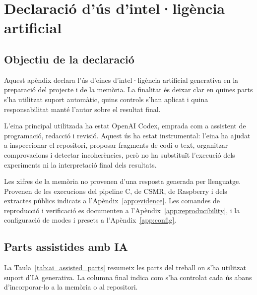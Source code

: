 \chapter{Declaració d'ús d'intel·ligència artificial}\label{app:ai}
\fancyhead[LO]{\slshape \textsf{\nouppercase \rightmark}}

\section{Objectiu de la declaració}

Aquest apèndix declara l'ús d'eines d'intel·ligència artificial generativa en
la preparació del projecte i de la memòria. La finalitat és deixar clar en
quines parts s'ha utilitzat suport automàtic, quins controls s'han aplicat i
quina responsabilitat manté l'autor sobre el resultat final.

L'eina principal utilitzada ha estat OpenAI Codex, emprada com a assistent de
programació, redacció i revisió. Aquest ús ha estat instrumental: l'eina ha
ajudat a inspeccionar el repositori, proposar fragments de codi o text,
organitzar comprovacions i detectar incoherències, però no ha substituït
l'execució dels experiments ni la interpretació final dels resultats.

Les xifres de la memòria no provenen d'una resposta generada per llenguatge.
Provenen de les execucions del pipeline C, de CSMR, de Raspberry i dels
extractes públics indicats a l'Apèndix~\ref{app:evidence}. Les comandes de
reproducció i verificació es documenten a l'Apèndix~\ref{app:reproducibility},
i la configuració de modes i presets a l'Apèndix~\ref{app:config}.

\section{Parts assistides amb IA}

La Taula~\ref{tab:ai_assisted_parts} resumeix les parts del treball on s'ha
utilitzat suport d'IA generativa. La columna final indica com s'ha controlat
cada ús abans d'incorporar-lo a la memòria o al repositori.

